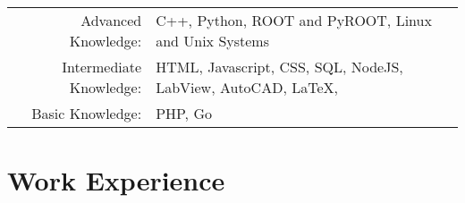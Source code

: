 \documentclass[a4paper,10pt]{article} %
\begin{document}
\begin{tabular}{rl}

Advanced Knowledge: & C++, Python, ROOT and PyROOT, Linux and Unix Systems \\
Intermediate Knowledge: & HTML, Javascript, CSS, SQL, NodeJS, LabView, AutoCAD, \LaTeX, \\
Basic Knowledge:        & PHP, Go
\end{tabular}
\vspace{1mm}


\section{Work Experience}
\end{document}
